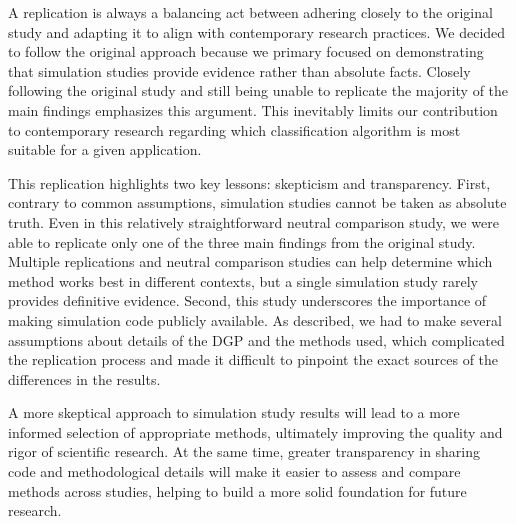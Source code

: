 \documentclass[12pt]{article}
\begin{document}
A replication is always a balancing act between adhering closely to the original study and adapting it to align with contemporary research practices. We decided to follow the original approach because we primary focused on demonstrating that simulation studies provide evidence rather than absolute facts. Closely following the original study and still being unable to replicate the majority of the main findings emphasizes this argument. This inevitably limits our contribution to contemporary research regarding which classification algorithm is most suitable for a given application.

This replication highlights two key lessons: skepticism and transparency. First, contrary to common assumptions, simulation studies cannot be taken as absolute truth. Even in this relatively straightforward neutral comparison study, we were able to replicate only one of the three main findings from the original study. Multiple replications and neutral comparison studies can help determine which method works best in different contexts, but a single simulation study rarely provides definitive evidence. Second, this study underscores the importance of making simulation code publicly available. As described, we had to make several assumptions about details of the DGP and the methods used, which complicated the replication process and made it difficult to pinpoint the exact sources of the differences in the results.

A more skeptical approach to simulation study results will lead to a more informed selection of appropriate methods, ultimately improving the quality and rigor of scientific research. At the same time, greater transparency in sharing code and methodological details will make it easier to assess and compare methods across studies, helping to build a more solid foundation for future research.

\printbibliography





\end{document}
